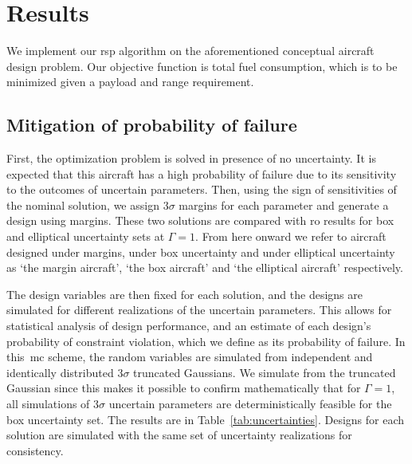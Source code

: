 \section{Results}

We implement our \gls{rsp} algorithm on the aforementioned conceptual aircraft design problem.
Our objective function is total fuel consumption, which is
to be minimized given a payload and range requirement.

\subsection{Mitigation of probability of failure}

First, the optimization problem is solved in presence of no uncertainty. It is expected
that this aircraft has a high probability of failure due to its sensitivity
to the outcomes of uncertain parameters. Then, using the sign of
sensitivities of the nominal solution, we assign $3\sigma$ margins for each parameter
and generate a design using margins. These two solutions are compared with \gls{ro} results for
box and elliptical uncertainty sets at $\Gamma = 1$. From here onward we refer to
aircraft designed under margins, under box uncertainty and
under elliptical uncertainty as `the margin aircraft', `the box aircraft' and `the elliptical aircraft' respectively.

The design variables are then fixed for each solution, and the designs are simulated for
different realizations of the uncertain parameters.
This allows for statistical analysis of design performance, and
an estimate of each design's probability of constraint
violation, which we define as its probability of failure.
In this~\gls{mc} scheme, the random variables
are simulated from independent and identically distributed $3\sigma$ truncated Gaussians.
We simulate from the truncated Gaussian since this makes it possible to
confirm mathematically that for $\Gamma = 1$, all simulations of $3\sigma$ uncertain parameters are
deterministically feasible for the box uncertainty set. The results are in Table~\ref{tab:uncertainties}.
Designs for each solution
are simulated with the same set of uncertainty realizations for consistency.

